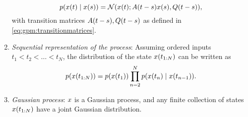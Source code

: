 \documentclass{mimosis}
\begin{document}
\begin{proposition}
\begin{enumerate}
\begin{equation}
  \label{eq:gpm:transitiondensities}
  \p(\st(t) \mid \st(s)) = \N(\st(t); \transA(t-s) \st(s), \transC(t-s)),
\end{equation}
with transition matrices \(A(t-s), Q(t-s)\) as defined in
\cref{eq:gpm:transitionmatrices}.
\item \emph{Sequential representation of the process}:
Assuming ordered inputs \({t_1 < t_2 < \dots < t_N}\),
the distribution of the state \(x(t_{1:N})\) can be written as
\begin{equation}
\p(\st(t_{1:N})) = \p(\st(t_1)) \prod_{\idxt=2}^N \p(\st(t_\idxt) \mid \st(t_{\idxt-1})).
\end{equation}
\item \emph{Gaussian process}: \(x\) is a Gaussian process, and any finite collection of states \(x(t_{1:N})\) have a joint Gaussian distribution.
\end{enumerate}
\end{proposition}
\end{document}
